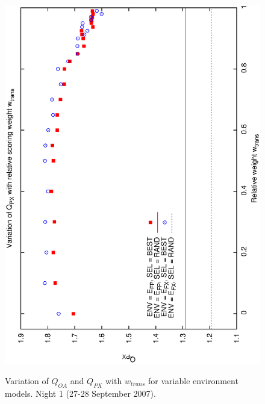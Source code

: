 \begin{figure}[h]
\begin{center}
{    \includegraphics[scale=0.5, angle=-90]{figures/cs1_dw1a2_px.eps}
    \label{fig:cs1_dw1a2_px}
  }
 \caption[Variation of $Q_{OA}$ and $Q_{PX}$ with $w_{trans}$  for variable environment models]
{Variation of $Q_{OA}$ and $Q_{PX}$ with $w_{trans}$  for variable environment models.  Night 1 (27-28 September 2007).}
\end{center}
\end{figure}

